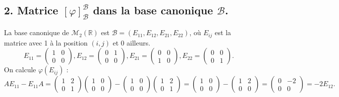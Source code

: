\documentclass[french]{yLectureNote}
\begin{document}
\subsection*{2. Matrice $[\varphi]_{\mathcal{B}}^{\mathcal{B}}$ dans la base canonique $\mathcal{B}$.}
La base canonique de $\mathcal{M}_2(\mathbb{R})$ est $\mathcal{B} = (E_{11}, E_{12}, E_{21}, E_{22})$, où $E_{ij}$ est la matrice avec 1 à la position $(i,j)$ et 0 ailleurs.
$$E_{11} = \begin{pmatrix} 1 & 0 \\ 0 & 0 \end{pmatrix}, E_{12} = \begin{pmatrix} 0 & 1 \\ 0 & 0 \end{pmatrix}, E_{21} = \begin{pmatrix} 0 & 0 \\ 1 & 0 \end{pmatrix}, E_{22} = \begin{pmatrix} 0 & 0 \\ 0 & 1 \end{pmatrix}.$$
On calcule $\varphi(E_{ij})$ :
$$AE_{11} - E_{11}A = \begin{pmatrix} 1 & 2 \\ 0 & 1 \end{pmatrix} \begin{pmatrix} 1 & 0 \\ 0 & 0 \end{pmatrix} - \begin{pmatrix} 1 & 0 \\ 0 & 0 \end{pmatrix} \begin{pmatrix} 1 & 2 \\ 0 & 1 \end{pmatrix} = \begin{pmatrix} 1 & 0 \\ 0 & 0 \end{pmatrix} - \begin{pmatrix} 1 & 2 \\ 0 & 0 \end{pmatrix} = \begin{pmatrix} 0 & -2 \\ 0 & 0 \end{pmatrix} = -2E_{12}.$$
\end{document}
